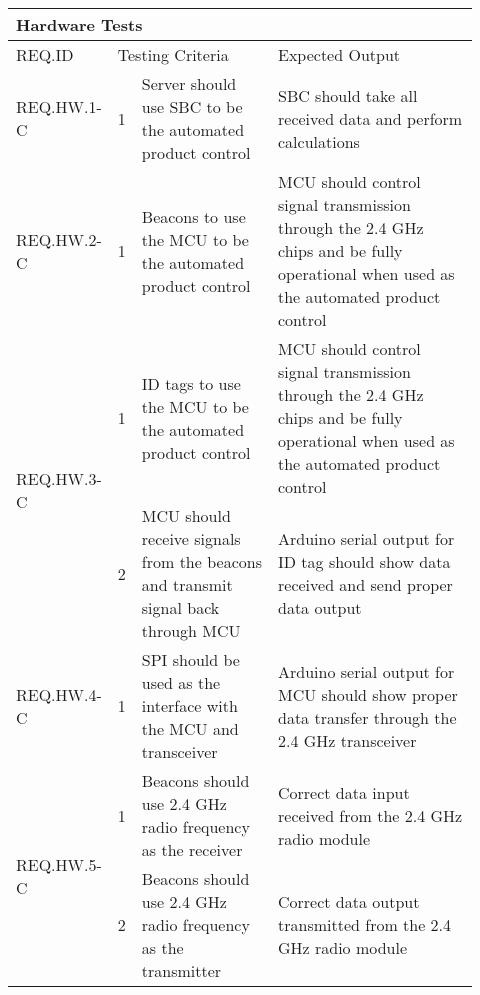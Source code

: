 \begin{table}[h!]
    \centering
    \begin{tabular}{|m{0.15\linewidth}|m{0.02\linewidth}|m{0.3\linewidth}|m{0.45\linewidth}|} 
    \hline
    \multicolumn{4}{|l|}{Hardware Tests}           \\ 
    \hline
    REQ.ID & \multicolumn{2}{l|}{Testing Criteria} & Expected Output         \\ 
    \hline
    REQ.HW.1-C                  
    & 1 
    & Server should use SBC to be the automated product control
    & SBC should take all received data and perform calculations   \\ 
    \hline
   
    REQ.HW.2-C                  
    & 1 
    & Beacons to use the MCU to be the automated product control
    & MCU should control signal transmission through the 2.4 GHz chips and be fully operational 
    when used as the automated product control         \\ 
    \hline
    
    \multirow{2}{*}{REQ.HW.3-C} 
    & 1 
    & ID tags to use the MCU to be the automated product control
    & MCU should control signal transmission through the 2.4 GHz chips and be fully operational 
    when used as the automated product control            \\ 
    \cline{2-4}
    & 2 
    & MCU should receive signals from the beacons and transmit signal back through MCU  
    & Arduino serial output for ID tag should show data received and send proper data output        \\
    \hline
    
    REQ.HW.4-C                  
    & 1 
    & SPI should be used as the interface with the MCU and transceiver
    & Arduino serial output for MCU should show proper data transfer through the 2.4 GHz transceiver   \\ 
    \hline
    
    \multirow{2}{*}{REQ.HW.5-C} 
    & 1 
    & Beacons should use 2.4 GHz radio frequency as the receiver     
    & Correct data input received from the 2.4 GHz radio module          \\ 
    \cline{2-4}
    & 2 
    & Beacons should use 2.4 GHz radio frequency as the transmitter     
    & Correct data output transmitted from the 2.4 GHz radio module   \\
    \hline
    

\end{tabular}
\end{table}

